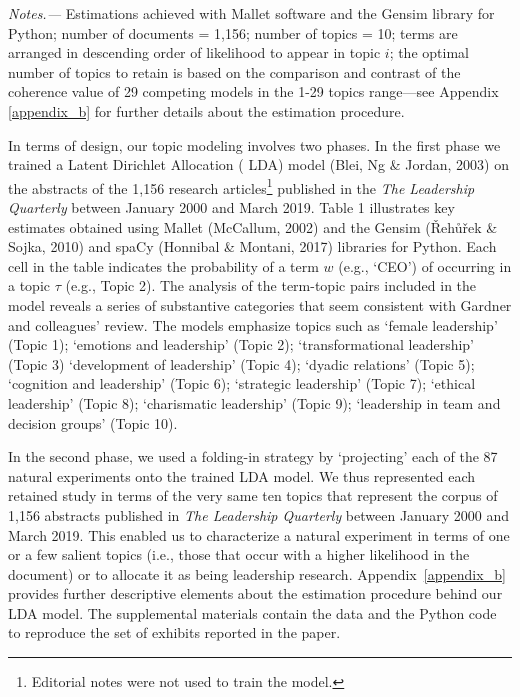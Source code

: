 \documentclass[english]{article}
\begin{document}
\begin{table}
{\begin{threeparttable}
\begin{tabular}{cccccccccccc}
	\bottomrule
	\end{tabular}
	\begin{tablenotes}[flushleft]
	\item {\textit{Notes.---} Estimations achieved with Mallet
			software and the Gensim library for Python; number of
			documents = 1,156; number of topics = 10; terms are
			arranged in descending order of likelihood to appear in
			topic $i$; the optimal number of topics to retain is based
		        on the comparison and contrast of the coherence value of 29
                 	competing models in the 1-29 topics range---see Appendix
                        \ref{appendix_b} for further details about the estimation procedure.}
	\end{tablenotes}
	\end{threeparttable}}
\end{table}

In terms of design, our topic modeling involves two phases. In the first phase
we trained a Latent Dirichlet Allocation ( LDA) model (Blei, Ng \& Jordan, 2003)
on the abstracts of the 1,156 research articles\footnote{Editorial notes were
not used to train the model.} published in the \emph{The Leadership Quarterly}
between January 2000 and March 2019. Table 1 illustrates key estimates obtained
using Mallet (McCallum, 2002) and the Gensim (Řehůřek \& Sojka, 2010) and spaCy
(Honnibal \& Montani, 2017) libraries for Python. Each cell in the table
indicates the probability of a term \(w\) (e.g., `CEO') of occurring in a topic
\(\tau\) (e.g., Topic 2). The analysis of the term-topic pairs included in the
model reveals a series of substantive categories that seem consistent with
Gardner and colleagues' review. The models emphasize topics such as `female
leadership' (Topic 1); `emotions and leadership' (Topic 2); `transformational
leadership' (Topic 3) `development of leadership' (Topic 4); `dyadic relations'
(Topic 5); `cognition and leadership' (Topic 6); `strategic leadership' (Topic
7); `ethical leadership' (Topic 8); `charismatic leadership' (Topic 9);
`leadership in team and decision groups' (Topic 10).

In the second phase, we used a folding-in strategy by `projecting' each of the
87 natural experiments onto the trained LDA model. We thus represented each
retained study in terms of the very same ten topics that represent the corpus of
1,156 abstracts published in \emph{The Leadership Quarterly} between January
2000 and March 2019. This enabled us to characterize a natural experiment in
terms of one or a few salient topics (i.e., those that occur with a higher
likelihood in the document) or to allocate it as being leadership research.
Appendix~\ref{appendix_b} provides further descriptive elements about the
estimation procedure behind our LDA model. The supplemental materials contain
the data and the Python code to reproduce the set of exhibits reported in the
paper.
\end{document}
